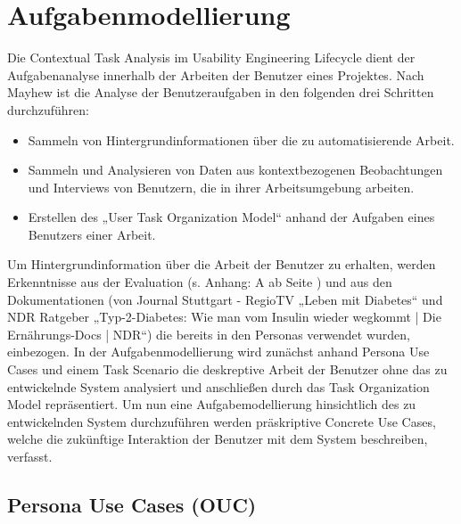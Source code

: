 \section{Aufgabenmodellierung}

Die Contextual Task Analysis im Usability Engineering Lifecycle dient der Aufgabenanalyse innerhalb der Arbeiten der Benutzer eines Projektes. Nach Mayhew \cite{MD} ist die Analyse der Benutzeraufgaben in den folgenden drei Schritten durchzuführen:
\begin{itemize}
	\item Sammeln von Hintergrundinformationen über die zu automatisierende Arbeit.
	\item Sammeln und Analysieren von Daten aus kontextbezogenen Beobachtungen und Interviews von Benutzern, die in ihrer Arbeitsumgebung arbeiten.
	\item Erstellen des „User Task Organization Model“ anhand der Aufgaben eines Benutzers einer Arbeit.
\end{itemize}

Um Hintergrundinformation über die Arbeit der Benutzer zu erhalten, werden Erkenntnisse aus der Evaluation (s. Anhang: A  ab Seite \pageref{section:Evaluation}) und aus den Dokumentationen (von Journal Stuttgart - RegioTV „Leben mit Diabetes“ und NDR Ratgeber „Typ-2-Diabetes: Wie man vom Insulin wieder wegkommt | Die Ernährungs-Docs | NDR“) die bereits in den Personas verwendet wurden, einbezogen.\newline
In der Aufgabenmodellierung wird zunächst anhand Persona Use Cases und einem Task Scenario die deskreptive Arbeit der Benutzer ohne das zu entwickelnde System analysiert und anschließen durch das Task Organization Model repräsentiert. Um nun eine Aufgabemodellierung hinsichtlich des zu entwickelnden System durchzuführen werden präskriptive Concrete Use Cases, welche die zukünftige Interaktion der Benutzer mit dem System beschreiben, verfasst. 

\subsection{Persona Use Cases (OUC)}

